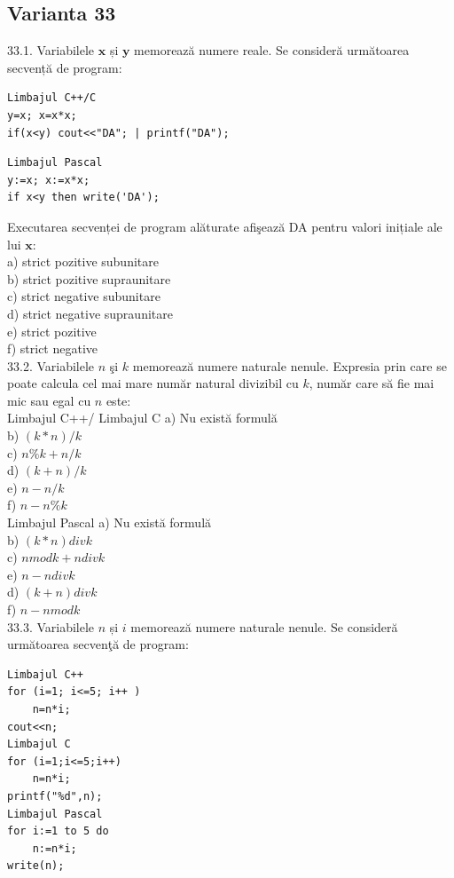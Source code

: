 \begin{itemize}
\begin{enumerate}
\section*{Varianta 33}

33.1. Variabilele $\mathbf{x}$ și $\mathbf{y}$ memorează numere reale. Se consideră următoarea secvență de program:
\begin{verbatim}
Limbajul C++/C
y=x; x=x*x;
if(x<y) cout<<"DA"; | printf("DA");
\end{verbatim}
\begin{verbatim}
Limbajul Pascal
y:=x; x:=x*x;
if x<y then write('DA');
\end{verbatim}
Executarea secvenței de program alăturate afişează DA pentru valori inițiale ale lui $\mathbf{x}$:
\\
a) strict pozitive subunitare
\\
b) strict pozitive supraunitare
\\
c) strict negative subunitare
\\
d) strict negative supraunitare
\\
e) strict pozitive
\\
f) strict negative
\\
33.2. Variabilele $n$ şi $k$ memorează numere naturale nenule. Expresia prin care se poate calcula cel mai mare număr natural divizibil cu $k$, număr care să fie mai mic sau egal cu $n$ este:
\\
Limbajul C++/ Limbajul C
a) Nu există formulă
\\
b) $(k * n) / k$
\\
c) $n \% k+n / k$
\\
d) $(k+n) / k$
\\
e) $n-n / k$
\\
f) $n-n \% k$
\\
Limbajul Pascal
a) Nu există formulă
\\
b) $(k * n) div k$
\\
c) $n mod k+n div k$
\\
e) $n-n div k$
\\
d) $(k+n) div k$
\\
f) $n-n mod k$
\\
33.3. Variabilele $n$ și $i$ memorează numere naturale nenule. Se consideră următoarea secvenţă de program:
\begin{verbatim}
Limbajul C++
for (i=1; i<=5; i++ )
    n=n*i;
cout<<n;
Limbajul C
for (i=1;i<=5;i++)
    n=n*i;
printf("%d",n);
Limbajul Pascal
for i:=1 to 5 do
    n:=n*i;
write(n);
\end{verbatim}

\end{enumerate}
\end{itemize}
